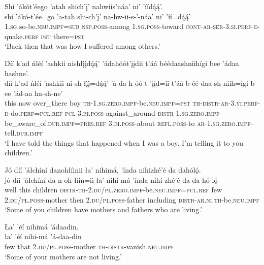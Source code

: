\ea\label{ex:text6-16-17}
Shí ’ákót’éego ’atah shich’į’ nahwiis’náa’ ni’ ’íídą́ą́’.\\
\gll shí	’ákó-t’ée=go	’a-tah	shi-ch’į’	na-hw-ii-s-’-náa’	ni’	’íí=dą́ą́’\\
     1.\textsc{sg}	so-be.\textsc{neu}.\textsc{impf}=\textsc{sub}	\textsc{nsp}.\textsc{poss}-among	1.\textsc{sg}.\textsc{poss}-toward	\textsc{cont}-\textsc{ar}-\textsc{ser}-3.\textsc{si}.\textsc{perf}-\textsc{d}-quake.\textsc{perf}	\textsc{pst}	there=\textsc{pst}\\
\glt `Back then that was how I suffered among others.'
\z

\ea\label{ex:text6-16-18}
Díí k’ad ńléí ’ashkii nishłį́į́dą́ą́’ ’ádahóót’įįdii t’áá béédaashniihígi bee ’ádaa hashne’.\\
\gll díí	k’ad	ńléí	’ashkii	ni-sh-łį́į́=dą́ą́’	’á-da-h-óó-t-’įįd=ii	t’áá	b-éé-daa-sh-niih=ígi	b-ee	’ád-aa	ha-sh-ne’\\
     this	now	over\_there	boy	\textsc{th}-1.\textsc{sg}.\textsc{zero}.\textsc{impf}-be.\textsc{neu}.\textsc{impf}=\textsc{pst}	\textsc{th}-\textsc{distr}-\textsc{ar}-3.\textsc{yi}.\textsc{perf}-\textsc{d}-do.\textsc{perf}=\textsc{pcl}.\textsc{ref}	\textsc{pcl}	3.\textsc{bi}.\textsc{poss}-against\_around-\textsc{distr}-1.\textsc{sg}.\textsc{zero}.\textsc{impf}-be\_aware\_of.\textsc{dur}.\textsc{impf}=\textsc{pres}.\textsc{ref}	3.\textsc{bi}.\textsc{poss}-about	\textsc{refl}.\textsc{poss}-to	\textsc{ar}-1.\textsc{sg}.\textsc{zero}.\textsc{impf}-tell.\textsc{dur}.\textsc{impf}\\
\glt `I have told the things that happened when I was a boy. I'm telling it to you children.'
\z

\newpage
\ea\label{ex:text6-16-19}
Jó díí ’áłchíní danohłíinii ła’ nihimá, ’índa nihizhé’é da dahólǫ́.\\
\gll jó	díí	’áłchíní	da-n-oh-łíin=ii	ła’	nihi-má	’índa	nihi-zhé’é	da	da-hó-lǫ́\\
     well	this	children	\textsc{distr}-\textsc{th}-2.\textsc{du}/\textsc{pl}.\textsc{zero}.\textsc{impf}-be.\textsc{neu}.\textsc{impf}=\textsc{pcl}.\textsc{ref}	few	2.\textsc{du}/\textsc{pl}.\textsc{poss}-mother	then	2.\textsc{du}/\textsc{pl}.\textsc{poss}-father	including	\textsc{distr}-\textsc{ar}.\textsc{ni}.\textsc{th}-be.\textsc{neu}.\textsc{impf}\\
\glt `Some of you children have mothers and fathers who are living.'
\z

\ea\label{ex:text6-16-20}
Ła’ ’éí nihimá ’ádaadin.\\
\gll ła’	’éí	nihi-má	’á-daa-din\\
     few	that	2.\textsc{du}/\textsc{pl}.\textsc{poss}-mother	\textsc{th}-\textsc{distr}-vanish.\textsc{neu}.\textsc{impf}\\
\glt `Some of your mothers are not living.'
\z

